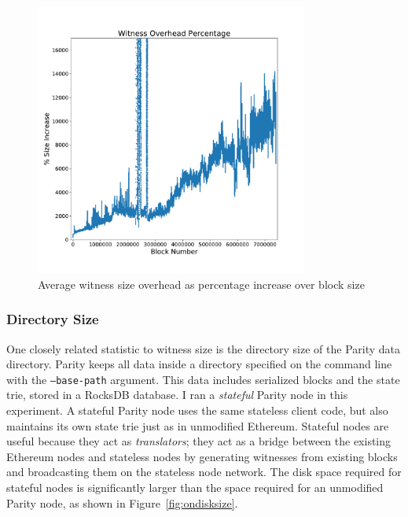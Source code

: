 \documentclass[12pt]{article}
\newcommand{\figurewidth}{0.8\textwidth}
\begin{document}
\begin{figure}[H]
  \centering
  \includegraphics[width=\figurewidth]{../figures/results/graphs/background/witness-block-size.pdf}
  \caption{Average witness size overhead as percentage increase over block size}
  \label{fig:witnesssizepct}
\end{figure}


\subsubsection{Directory Size}

One closely related statistic to witness size is the directory size of the Parity data directory. Parity keeps all data inside a directory specified on the command line with the \texttt{--base-path} argument. This data includes serialized blocks and the state trie, stored in a RocksDB database. I ran a \emph{stateful} Parity node in this experiment. A stateful Parity node uses the same stateless client code, but also maintains its own state trie just as in unmodified Ethereum. Stateful nodes are useful because they act as \emph{translators}; they act as a bridge between the existing Ethereum nodes and stateless nodes by generating witnesses from existing blocks and broadcasting them on the stateless node network. The disk space required for stateful nodes is significantly larger than the space required for an unmodified Parity node, as shown in Figure~\ref{fig:ondisksize}.
\end{document}
